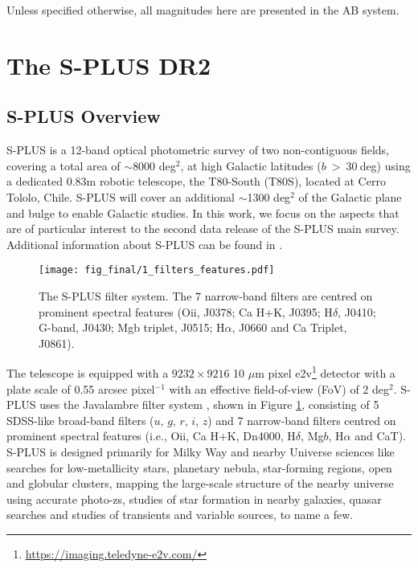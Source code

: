 \documentclass[fleqn,usenatbib]{mnras}
\newcommand{\nb}[3]{{\colorbox{#2}{\bfseries\sffamily\scriptsize\textcolor{white}{#1}}}
 {\textcolor{#2}{\sf{#3}}}}
\newcommand{\todo}[1]{\nb{TO-DO}{orange}{#1}}
\newcommand{\ionnote}[2]{{\textrm{#1}}{\textrm{\sc #2}}}
\begin{document}
Unless specified otherwise, all magnitudes here are presented in the AB system.


\section{The S-PLUS DR2}
\label{sec::SPLUS}

\subsection{S-PLUS Overview}

S-PLUS is a 12-band optical photometric survey of two non-contiguous fields, covering a total area of $\sim$8000 deg$^{2}$, at high Galactic latitudes ($b~>~30~$deg) using a dedicated 0.83m robotic telescope, the T80-South (T80S), located at Cerro Tololo, Chile. S-PLUS will cover an additional $\sim$1300 deg$^{2}$ of the Galactic plane and bulge to enable Galactic studies. In this work, we focus on the aspects that are of particular interest to the second data release of the S-PLUS main survey. Additional information about S-PLUS can be found in \citet{MendesDeOliveira+2019}.

\begin{figure}
\begin{center}
\texttt{[image: fig\_final/1\_filters\_features.pdf]}
\caption{\label{fig:SPLUS_filters}The S-PLUS filter system. The 7 narrow-band filters are centred on prominent spectral features (\ionnote{O}{ii}, J0378;  Ca H+K, J0395; H$\delta$, J0410; G-band, J0430; Mgb triplet, J0515; H$\alpha$, J0660 and Ca Triplet, J0861). }%
\end{center}
\end{figure}

The telescope is equipped with a $9232 \times 9216$ 10 $\mu$m pixel e2v\footnote{\url{https://imaging.teledyne-e2v.com/}} detector with a plate scale of 0.55 arcsec pixel$^{-1}$ with an effective field-of-view (FoV) of 2 deg$^2$. S-PLUS uses the Javalambre filter system \citep{MarinFranch+2012}, shown in Figure \ref{fig:SPLUS_filters}, consisting of 5 SDSS-like broad-band filters ($u$, $g$, $r$, $i$, $z$) and 7 narrow-band filters centred on prominent spectral features (i.e., \ionnote{O}{ii}, Ca H+K, Dn4000, H$\delta$, Mg$b$, H$\alpha$ and CaT). S-PLUS is designed primarily for Milky Way and nearby Universe sciences like searches for low-metallicity stars, planetary nebula, star-forming regions, open and globular clusters, mapping the large-scale structure of the nearby universe using accurate photo-zs, studies of star formation in nearby galaxies, quasar searches and studies of transients and variable sources, to name a few.
\end{document}
